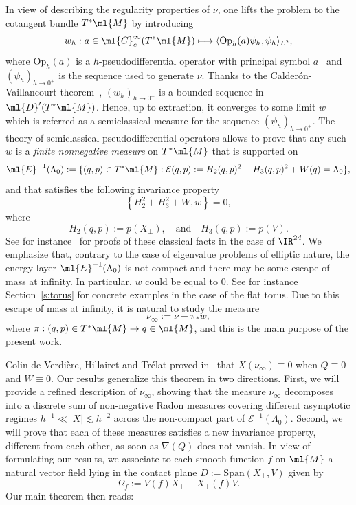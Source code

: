 \documentclass[JEP,XML,SOM,Unicode, NoEqCountersInSection,published]{cedram}
\newcommand\mto{\mathchoice{\longmapsto}{\mapsto}{\mapsto}{\mapsto}}
\theoremstyle{plain}
\theoremstyle{definition}
\theoremstyle{remark}
\newcommand{\Op}{\operatorname{Op}}
\begin{document}
In view of describing the regularity properties of $\nu$, one lifts the problem to the cotangent bundle $T^*\ml{M}$ by introducing
\[
w_h:a\in\ml{C}^{\infty}_c(T^*\ml{M})\mto\langle \Op_h(a)\psi_h,\psi_h\rangle_{L^2},
\]
where $\text{Op}_h(a)$ is a $h$-pseudodifferential operator with principal symbol $a$~\cite[Th.\,14.1]{Zworski12} and $(\psi_h)_{h\to 0^+}$ is the sequence used to generate $\nu$. Thanks to the Calderón-Vaillancourt theorem~\cite[Th.\,5.1]{Zworski12}, $(w_h)_{h\to 0^+}$ is a bounded sequence in $\ml{D}^\prime(T^*\ml{M})$. Hence, up to extraction, it converges to some limit $w$ which is referred as a semiclassical measure for the sequence $(\psi_h)_{h\to 0^+}$. The theory of semiclassical pseudodifferential operators allows to prove that any such $w$ is a \emph{finite nonnegative measure} on $T^*\ml{M}$ that is supported on
\[
\ml{E}^{-1}(\Lambda_0):=\{(q,p)\in T^*\ml{M}: \mathcal{E}(q,p) := H_2(q,p)^2+H_3(q,p)^2+W(q)=\Lambda_0\},
\]
and that satisfies the following invariance property
\[
\left\{H_2^2+H_3^2+W,w\right\}=0,
\]
where
\[
H_2(q,p):=p(X_\perp),\quad\text{and}\quad H_3(q,p):=p(V).
\]
See for instance~\cite[\S5.2]{Zworski12} for proofs of these classical facts in the case of $\IR^{2d}$. We emphasize that, contrary to the case of eigenvalue problems of elliptic nature, the energy layer $\ml{E}^{-1}(\Lambda_0)$ is not compact and there may be some escape of mass at infinity. In particular, $w$ could be equal to $0$. See for instance Section~\ref{s:torus} for concrete examples in the case of the flat torus. Due to this escape of mass at infinity, it is natural to study the measure
\[
\nu_\infty:=\nu-\pi_*w,
\]
where $\pi:(q,p)\in T^*\ml{M}\to q\in \ml{M}$, and this is the main purpose of the present work.


Colin de Verdière, Hillairet and Trélat proved in~\cite[Th.\,B]{ColindeVerdiereHillairetTrelat15} that $X(\nu_\infty)\equiv0$ when $Q\equiv0$ and $W\equiv 0$.
Our results generalize this theorem in two directions. First, we will provide a refined description of $\nu_\infty$, showing that the measure $\nu_\infty$ decomposes into a discrete sum of non-negative Radon measures covering different asymptotic regimes $h^{-1}\ll |X|\lesssim h^{-2}$ across the non-compact part of $\mathcal{E}^{-1}(\Lambda_0)$. Second, we will prove that each of these measures satisfies a new invariance property, different from each-other, as soon as $\nabla(Q)$ does not vanish. In view of formulating our results, we associate to each smooth function $f$ on $\ml{M}$ a natural vector field lying in the contact plane $D:=\text{Span}(X_\perp,V)$ given by
\[
\Omega_f:=V(f)X_\perp-X_\perp(f)V.
\]
Our main theorem then reads:
\end{document}
